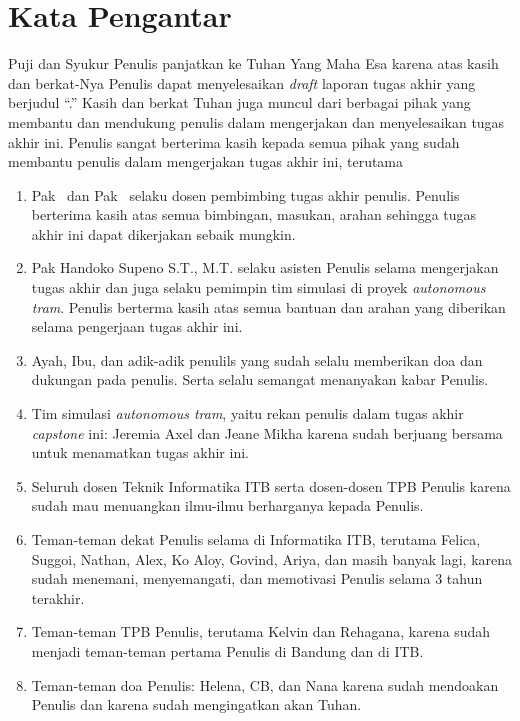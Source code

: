 \chapter*{Kata Pengantar}

Puji dan Syukur Penulis panjatkan ke Tuhan Yang Maha Esa karena atas kasih dan
berkat-Nya Penulis dapat menyelesaikan \textit{draft} laporan tugas akhir yang
berjudul ``\thetitle.'' Kasih dan berkat Tuhan juga muncul dari berbagai pihak
yang membantu dan mendukung penulis dalam mengerjakan dan menyelesaikan tugas
akhir ini. Penulis sangat berterima kasih kepada semua pihak yang sudah membantu
penulis dalam mengerjakan tugas akhir ini, terutama

\begin{enumerate}
	\item Pak \pembimbingSatu\ dan Pak \pembimbingDua\ selaku dosen pembimbing
	tugas akhir penulis. Penulis berterima kasih atas semua bimbingan, masukan,
	arahan sehingga tugas akhir ini dapat dikerjakan sebaik mungkin.
	\item Pak Handoko Supeno S.T., M.T. selaku asisten Penulis selama
	mengerjakan tugas akhir dan juga selaku pemimpin tim simulasi di proyek
	\textit{autonomous tram}. Penulis berterma kasih atas semua bantuan dan
	arahan yang diberikan selama pengerjaan tugas akhir ini.
	\item Ayah, Ibu, dan adik-adik penulils yang sudah selalu memberikan doa dan
	dukungan pada penulis. Serta selalu semangat menanyakan kabar Penulis.
	\item Tim simulasi \textit{autonomous tram}, yaitu rekan penulis dalam tugas
	akhir \textit{capstone} ini: Jeremia Axel dan Jeane Mikha karena sudah
	berjuang bersama untuk menamatkan tugas akhir ini.
	\item Seluruh dosen Teknik Informatika ITB serta dosen-dosen TPB Penulis
	karena sudah mau menuangkan ilmu-ilmu berharganya kepada Penulis.
	\item Teman-teman dekat Penulis selama di Informatika ITB, terutama Felica,
	Suggoi, Nathan, Alex, Ko Aloy, Govind, Ariya, dan masih banyak lagi, karena
	sudah menemani, menyemangati, dan memotivasi Penulis selama 3 tahun
	terakhir.
	\item Teman-teman TPB Penulis, terutama Kelvin dan Rehagana, karena sudah
	menjadi teman-teman pertama Penulis di Bandung dan di ITB.
	\item Teman-teman doa Penulis: Helena, CB, dan Nana karena sudah mendoakan
	Penulis dan karena sudah mengingatkan akan Tuhan.
\end{enumerate}
